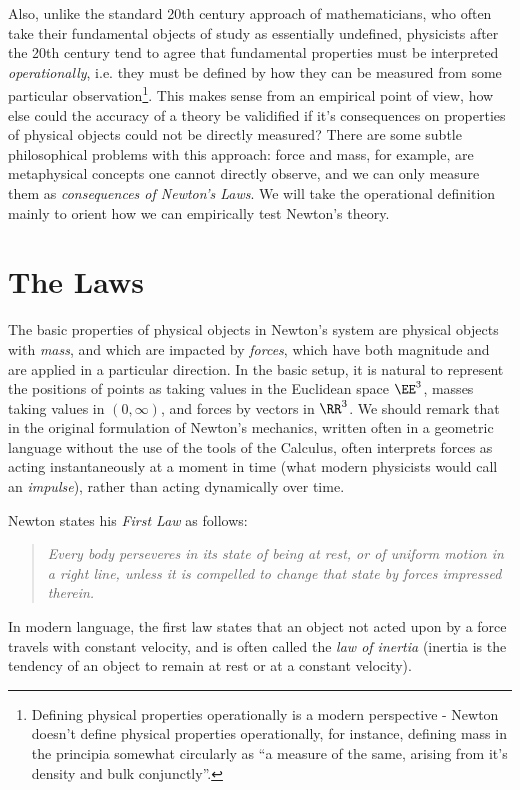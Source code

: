 Also, unlike the standard 20th century approach of mathematicians, who often take their fundamental objects of study as essentially undefined, physicists after the 20th century tend to agree that fundamental properties must be interpreted \emph{operationally}, i.e. they must be defined by how they can be measured from some particular observation\footnote{Defining physical properties operationally is a modern perspective - Newton doesn't define physical properties operationally, for instance, defining mass in the principia somewhat circularly as ``a measure of the same, arising from it's density and bulk conjunctly''.}. This makes sense from an empirical point of view, how else could the accuracy of a theory be validified if it's consequences on properties of physical objects could not be directly measured? There are some subtle philosophical problems with this approach: force and mass, for example, are metaphysical concepts one cannot directly observe, and we can only measure them as \emph{consequences of Newton's Laws}. We will take the operational definition mainly to orient how we can empirically test Newton's theory.

\section{The Laws}

The basic properties of physical objects in Newton's system are physical objects with \emph{mass}, and which are impacted by \emph{forces}, which have both magnitude and are applied in a particular direction. In the basic setup, it is natural to represent the positions of points as taking values in the Euclidean space $\EE^3$, masses taking values in $(0,\infty)$, and forces by vectors in $\RR^3$. We should remark that in the original formulation of Newton's mechanics, written often in a geometric language without the use of the tools of the Calculus, often interprets forces as acting instantaneously at a moment in time (what modern physicists would call an \emph{impulse}), rather than acting dynamically over time.

Newton states his \emph{First Law} as follows:
%
\begin{quote}
    \emph{Every body perseveres in its state of being at rest, or of uniform motion in a right line, unless it is compelled to change that state by forces impressed therein.}
\end{quote}
%
In modern language, the first law states that an object not acted upon by a force travels with constant velocity, and is often called the \emph{law of inertia} (inertia is the tendency of an object to remain at rest or at a constant velocity).

